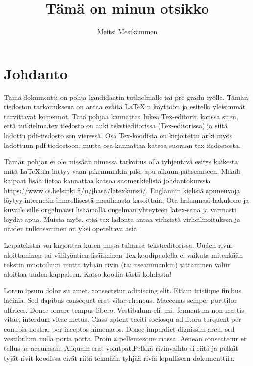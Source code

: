 \documentclass[a4paper,12 pt]{article}
\author{Meitsi Mesikämmen}
\title{Tämä on minun otsikko}
\theoremstyle{plain}
\theoremstyle{definition}
\theoremstyle{remark}
\numberwithin{equation}{section}
\numberwithin{figure}{section}
\begin{document}
\maketitle

\newpage
\tableofcontents

\newpage
\section*{Johdanto}

Tämä dokumentti on pohja kandidaatin tutkielmalle tai pro gradu työlle. Tämän tiedoston tarkoituksena on antaa eväitä \LaTeX :n käyttöön ja esitellä yleisimmät tarvittavat komennot. Tätä pohjaa kannattaa lukea Tex-editorin kanssa siten, että tutkielma.tex tiedosto on auki tekstieditorissa (Tex-editorissa) ja siitä ladottu pdf-tiedosto sen vieressä. Osa Tex-koodista on kirjoitettu auki myös ladottuun pdf-tiedostoon, mutta osa kannattaa katsoa suoraan tex-tiedostosta.

Tämän pohjan ei ole missään nimessä tarkoitus olla tyhjentävä esitys kaikesta mitä \LaTeX :iin liittyy vaan pikemminkin pika-apu alkuun pääsemiseen. Mikäli kaipaat lisää tietoa kannattaa katsoa suomenkielistä johdantokurssia \url{https://www.cs.helsinki.fi/u/jhasa/latexkurssi/}. Englannin kielisiä apuneuvoja löytyy internetin ihmeellisestä maailmasta kasoittain. Ota haluamasi hakukone
 ja kuvaile sille ongelmaasi lisäämällä ongelman yhteyteen latex-sana ja varmasti löydät apua. Muista myös, että tex-ladonta antaa virheistä virheilmoituksen ja näiden tulkitseminen on yksi opeteltava asia. 

Leipätekstiä voi kirjoittaa kuten missä tahansa tekstieditorissa.
Uuden rivin aloittaminen tai välilyöntien lisääminen Tex-koodipuolella ei vaikuta mitenkään tekstin muotoiluun mutta tyhjän rivin (tai useammankin) jättäminen väliin aloittaa uuden kappaleen. Katso koodia tästä kohdasta!


Lorem ipsum dolor sit amet, consectetur adipiscing elit. Etiam tristique finibus lacinia. Sed dapibus consequat erat vitae rhoncus. Maecenas semper porttitor ultrices. Donec ornare tempus libero. Vestibulum elit mi, fermentum non mattis vitae, interdum vitae metus. Class aptent taciti sociosqu ad litora torquent per conubia nostra, per inceptos himenaeos. Donec imperdiet dignissim arcu, sed vestibulum nulla porta porta. Proin a pellentesque massa. Aenean consectetur et tellus ac accumsan. Aliquam erat volutpat.Pelkkä rivinvaihto ei riitä ja pelkät tyjät rivit koodissa eivät riitä tekmään tyhjää riviä lopulliseen dokumenttiin.
\end{document}
